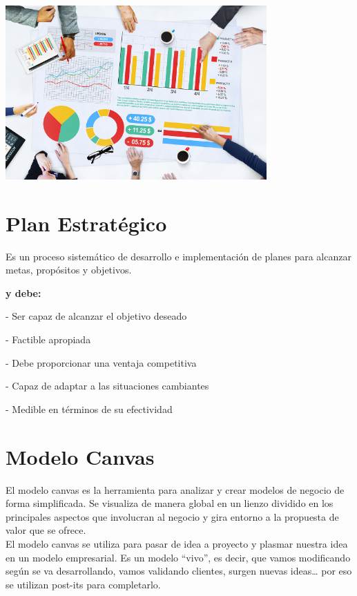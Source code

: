\begin{center}
\includegraphics[width=10cm]{./Imagenes/img5}
\end{center}

\section{Plan Estratégico}
\item{Es un proceso sistemático de desarrollo e implementación de planes para alcanzar metas, propósitos y objetivos.}
\\
\item \textbf{y debe:}
\item - Ser capaz de alcanzar el objetivo deseado
\item - Factible apropiada
\item - Debe proporcionar una ventaja competitiva
\item - Capaz de adaptar a las situaciones cambiantes
\item - Medible en términos de su efectividad

\section{Modelo Canvas}
\item{El modelo canvas es la herramienta para analizar y crear modelos de negocio de forma simplificada. Se visualiza de manera global en un lienzo dividido en los principales aspectos que involucran al negocio y gira entorno a la propuesta de valor que se ofrece.
\\
El modelo canvas se utiliza para pasar de idea a proyecto y plasmar nuestra idea en un modelo empresarial. Es un modelo “vivo”, es decir, que vamos modificando según se va desarrollando, vamos validando clientes, surgen nuevas ideas… por eso se utilizan post-its para completarlo.
}

